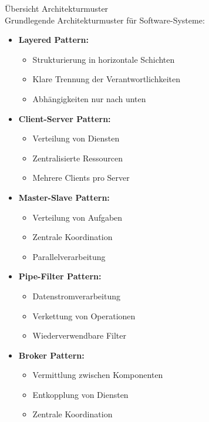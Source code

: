 \begin{concept}{Übersicht Architekturmuster}\\
Grundlegende Architekturmuster für Software-Systeme:

\begin{itemize}
    \item \textbf{Layered Pattern:} 
    \begin{itemize}
        \item Strukturierung in horizontale Schichten
        \item Klare Trennung der Verantwortlichkeiten
        \item Abhängigkeiten nur nach unten
    \end{itemize}
    
    \item \textbf{Client-Server Pattern:}
    \begin{itemize}
        \item Verteilung von Diensten
        \item Zentralisierte Ressourcen
        \item Mehrere Clients pro Server
    \end{itemize}
    
    \item \textbf{Master-Slave Pattern:}
    \begin{itemize}
        \item Verteilung von Aufgaben
        \item Zentrale Koordination
        \item Parallelverarbeitung
    \end{itemize}
    
    \item \textbf{Pipe-Filter Pattern:}
    \begin{itemize}
        \item Datenstromverarbeitung
        \item Verkettung von Operationen
        \item Wiederverwendbare Filter
    \end{itemize}
    
    \item \textbf{Broker Pattern:}
    \begin{itemize}
        \item Vermittlung zwischen Komponenten
        \item Entkopplung von Diensten
        \item Zentrale Koordination
    \end{itemize}
    

\end{itemize}
\end{concept}
